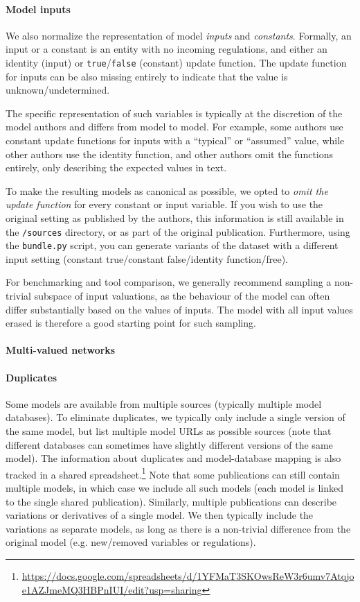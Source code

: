 \documentclass{article}
\begin{document}
\paragraph{Model inputs} We also normalize the representation of model \emph{inputs} and \emph{constants}. Formally, an input or a constant is an entity with no incoming regulations, and either an identity (input) or \texttt{true}/\texttt{false} (constant) update function. The update function for inputs can be also missing entirely to indicate that the value is unknown/undetermined.

The specific representation of such variables is typically at the discretion of the model authors and differs from model to model. For example, some authors use constant update functions for inputs with a ``typical'' or ``assumed'' value, while other authors use the identity function, and other authors omit the functions entirely, only describing the expected values in text.

To make the resulting models as canonical as possible, we opted to \emph{omit the update function} for every constant or input variable. If you wish to use the original setting as published by the authors, this information is still available in the \texttt{/sources} directory, or as part of the original publication. Furthermore, using the \texttt{bundle.py} script, you can generate variants of the dataset with a different input setting (constant true/constant false/identity function/free).

For benchmarking and tool comparison, we generally recommend sampling a non-trivial subspace of input valuations, as the behaviour of the model can often differ substantially based on the values of inputs. The model with all input values erased is therefore a good starting point for such sampling.

\paragraph{Multi-valued networks} 

\paragraph{Duplicates} Some models are available from multiple sources (typically multiple model databases). To eliminate duplicates, we typically only include a single version of the same model, but list multiple model URLs as possible sources (note that different databases can sometimes have slightly different versions of the same model). The information about duplicates and model-database mapping is also tracked in a shared spreadsheet.\footnote{\url{https://docs.google.com/spreadsheets/d/1YFMaT3SKOwsReW3r6umv7Atqjoe1AZJmeMQ3HBPnIUI/edit?usp=sharing}} Note that some publications can still contain multiple models, in which case we include all such models (each model is linked to the single shared publication). Similarly, multiple publications can describe variations or derivatives of a single model. We then typically include the variations as separate models, as long as there is a non-trivial difference from the original model (e.g. new/removed variables or regulations).
\end{document}
